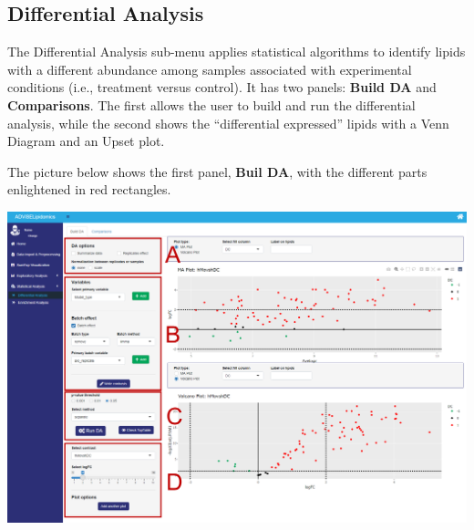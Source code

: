 \documentclass[
]{book}
\begin{document}
\hypertarget{sec351}{%
\subsection{Differential Analysis}\label{sec351}}

The Differential Analysis sub-menu applies statistical algorithms to identify lipids with a different abundance among samples associated with experimental conditions (i.e., treatment versus control). It has two panels: \textbf{Build DA} and \textbf{Comparisons}. The first allows the user to build and run the differential analysis, while the second shows the ``differential expressed'' lipids with a Venn Diagram and an Upset plot.

The picture below shows the first panel, \textbf{Buil DA}, with the different parts enlightened in red rectangles.

\includegraphics[width=1\linewidth]{images/DA}
\end{document}
